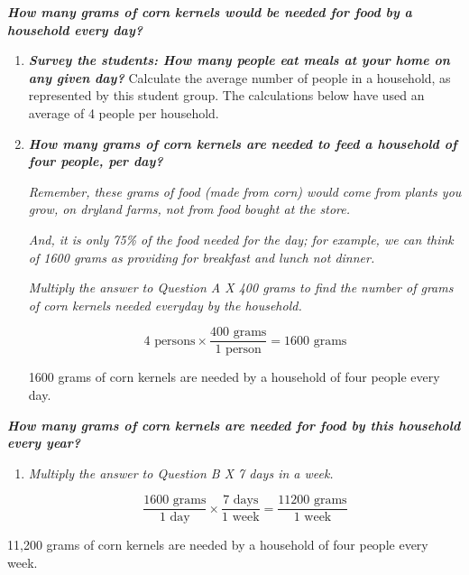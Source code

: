 \documentclass[12pt,]{article}
\begin{document}
\textbf{\emph{How many grams of {corn kernels} would be needed for food by a household {every day}?}}

\begin{enumerate}
\def\labelenumi{\Alph{enumi}.}
\item
  \textbf{\emph{Survey the students: How many people eat meals at your home on any given day?} }Calculate the average number of people in a household, as represented by this student group. The calculations below have used an average of 4 people per household.
\item
  \textbf{\emph{How many grams of corn kernels are needed to feed a household of four people, per day?}}

  \emph{Remember, these grams of food (made from corn) would come from plants you grow, on dryland farms, not from food bought at the store. }

  \emph{And, it is only 75\% of the food needed for the day; for example, we can think of 1600 grams as providing for breakfast and lunch not dinner.}

  \emph{Multiply the answer to Question A X 400 grams to find the number of grams of corn kernels needed everyday by the household. }

  \[ 4 \text{ persons} \times \frac{400 \text{ grams}}{1 \text{ person}} = 1600 \text{ grams}\]

  1600 grams of corn kernels are needed by a household of four people every day.
\end{enumerate}

\textbf{\emph{How many grams of {corn kernels} are needed for food by this household {every year}? }}

\begin{enumerate}
\def\labelenumi{\Alph{enumi}.}
\setcounter{enumi}{2}
\item
  \emph{Multiply the answer to Question B X 7 days in a week.}

  \[\frac{1600\text{ grams}}{1\text{ day}}\times\frac{7\text{ days}}{1\text{ week}}=\frac{11200\text{ grams}}{1 \text{ week}}\]
\end{enumerate}

11,200 grams of corn kernels are needed by a household of four people every week.
\end{document}
